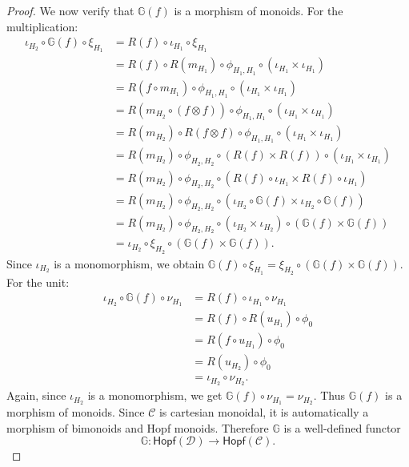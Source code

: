 \documentclass{amsart}
\begin{document}
\begin{proof}
We now verify that $\mathbb{G}(f)$ is a morphism of monoids. For the multiplication:
\begin{align*}
\iota_{H_2} \circ \mathbb{G}(f) \circ \xi_{H_1}
&= R(f) \circ \iota_{H_1} \circ \xi_{H_1} \\
&= R(f) \circ R(m_{H_1}) \circ \phi_{H_1,H_1} \circ (\iota_{H_1} \times \iota_{H_1}) \\
&= R(f \circ m_{H_1}) \circ \phi_{H_1,H_1} \circ (\iota_{H_1} \times \iota_{H_1}) \\
&= R(m_{H_2} \circ (f \otimes f)) \circ \phi_{H_1,H_1} \circ (\iota_{H_1} \times \iota_{H_1}) \\
&= R(m_{H_2}) \circ R(f \otimes f) \circ \phi_{H_1,H_1} \circ (\iota_{H_1} \times \iota_{H_1}) \\
&= R(m_{H_2}) \circ \phi_{H_2,H_2} \circ (R(f) \times R(f)) \circ (\iota_{H_1} \times \iota_{H_1}) \\
&= R(m_{H_2}) \circ \phi_{H_2,H_2} \circ (R(f) \circ \iota_{H_1} \times R(f) \circ \iota_{H_1}) \\
&= R(m_{H_2}) \circ \phi_{H_2,H_2} \circ (\iota_{H_2} \circ \mathbb{G}(f) \times \iota_{H_2} \circ \mathbb{G}(f)) \\
&= R(m_{H_2}) \circ \phi_{H_2,H_2} \circ (\iota_{H_2} \times \iota_{H_2}) \circ (\mathbb{G}(f) \times \mathbb{G}(f)) \\
&= \iota_{H_2} \circ \xi_{H_2} \circ (\mathbb{G}(f) \times \mathbb{G}(f)).
\end{align*}
Since $\iota_{H_2}$ is a monomorphism, we obtain $\mathbb{G}(f) \circ \xi_{H_1} = \xi_{H_2} \circ (\mathbb{G}(f) \times \mathbb{G}(f))$. For the unit:
\begin{align*}
\iota_{H_2} \circ \mathbb{G}(f) \circ \nu_{H_1}
&= R(f) \circ \iota_{H_1} \circ \nu_{H_1} \\
&= R(f) \circ R(u_{H_1}) \circ \phi_0 \\
&= R(f \circ u_{H_1}) \circ \phi_0 \\
&= R(u_{H_2}) \circ \phi_0 \\
&= \iota_{H_2} \circ \nu_{H_2}.
\end{align*}
Again, since $\iota_{H_2}$ is a monomorphism, we get $\mathbb{G}(f) \circ \nu_{H_1} = \nu_{H_2}$. Thus $\mathbb{G}(f)$ is a morphism of monoids. Since $\mathcal{C}$ is cartesian monoidal, it is automatically a morphism of bimonoids and Hopf monoids. Therefore $\mathbb{G}$ is a well-defined functor
\[
\mathbb{G} \colon \mathsf{Hopf}(\mathcal{D}) \longrightarrow \mathsf{Hopf}(\mathcal{C}).
\]


\end{proof}
\end{document}
